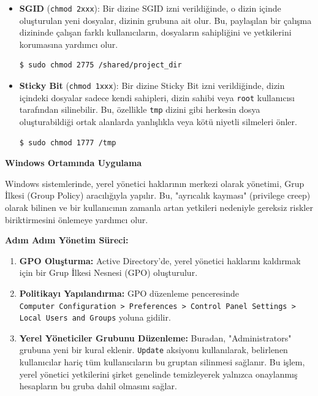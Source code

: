 \begin{itemize}
    \item \textbf{SGID} (\texttt{chmod 2xxx}): Bir dizine SGID izni verildiğinde, o dizin içinde oluşturulan yeni dosyalar, dizinin grubuna ait olur. Bu, paylaşılan bir çalışma dizininde çalışan farklı kullanıcıların, dosyaların sahipliğini ve yetkilerini korumasına yardımcı olur.
    \begin{verbatim}
$ sudo chmod 2775 /shared/project_dir
    \end{verbatim}
    \item \textbf{Sticky Bit} (\texttt{chmod 1xxx}): Bir dizine Sticky Bit izni verildiğinde, dizin içindeki dosyalar sadece kendi sahipleri, dizin sahibi veya \texttt{root} kullanıcısı tarafından silinebilir. Bu, özellikle \texttt{tmp} dizini gibi herkesin dosya oluşturabildiği ortak alanlarda yanlışlıkla veya kötü niyetli silmeleri önler.
    \begin{verbatim}
$ sudo chmod 1777 /tmp
    \end{verbatim}
\end{itemize}

\textbf{Windows Ortamında Uygulama}

Windows sistemlerinde, yerel yönetici haklarının merkezi olarak yönetimi, Grup İlkesi (Group Policy) aracılığıyla yapılır. Bu, "ayrıcalık kayması" (privilege creep) olarak bilinen ve bir kullanıcının zamanla artan yetkileri nedeniyle gereksiz riskler biriktirmesini önlemeye yardımcı olur.

\textbf{Adım Adım Yönetim Süreci:}

\begin{enumerate}
    \item \textbf{GPO Oluşturma:} Active Directory'de, yerel yönetici haklarını kaldırmak için bir Grup İlkesi Nesnesi (GPO) oluşturulur.
    \item \textbf{Politikayı Yapılandırma:} GPO düzenleme penceresinde \\
    \texttt{Computer Configuration > Preferences > Control Panel Settings > \\
    Local Users and Groups} yoluna gidilir.
    \item \textbf{Yerel Yöneticiler Grubunu Düzenleme:} Buradan, "Administrators" grubuna yeni bir kural eklenir. \texttt{Update} aksiyonu kullanılarak, belirlenen kullanıcılar hariç tüm kullanıcıların bu gruptan silinmesi sağlanır. Bu işlem, yerel yönetici yetkilerini şirket genelinde temizleyerek yalnızca onaylanmış hesapların bu gruba dahil olmasını sağlar.
\end{enumerate}


